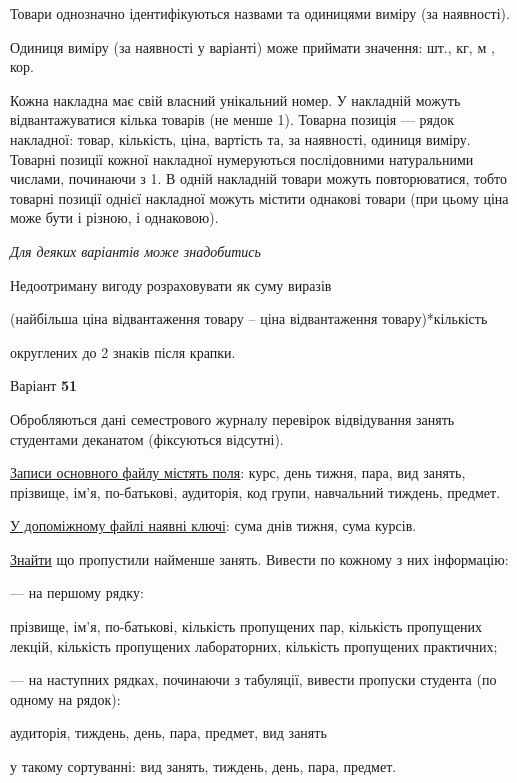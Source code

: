 \documentclass[11pt, ukrainian]{article}
\begin{document}
Товари однозначно ідентифікуються назвами та одиницями виміру (за наявності).

Одиниця виміру (за наявності у варіанті) може приймати значення: шт., кг, м , кор.

Кожна накладна має свій власний унікальний номер.
У накладній можуть відвантажуватися кілька товарів (не менше 1).
Товарна позиція --- рядок накладної: товар, кількість, ціна, вартість та, за наявності, одиниця виміру.
Товарні позиції кожної накладної нумеруються послідовними натуральними числами, починаючи з 1.
В одній накладній товари можуть повторюватися, 
тобто товарні позиції однієї накладної можуть містити однакові товари 
(при цьому ціна може бути і різною, і однаковою).

\bigskip\textit{Для деяких варіантів може знадобитись}

Недоотриману вигоду розраховувати як суму виразів
{\center (найбільша ціна відвантаження товару – ціна відвантаження товару)*кількість\par}

\bigskip
{\noindent} округлених до 2 знаків після крапки.




\par
\newpage

{\center Варіант  \No \textbf { 51 }\par}
\bigskip
Обробляються дані семестрового журналу перевірок відвідування занять студентами деканатом (фіксуються відсутні). 

\underline{Записи основного файлу містять поля}: курс, день тижня, пара, вид занять, прізвище, ім’я, по-батькові, аудиторія, код групи, навчальний тиждень, предмет.

\underline{У допоміжному файлі наявні ключі}: сума днів тижня, сума курсів.

\underline{Знайти} що пропустили найменше занять. Вивести по кожному з них інформацію:\par
{\noindent}--- на першому рядку:\par
прізвище, ім’я, по-батькові, кількість пропущених пар, кількість пропущених лекцій, кількість пропущених лабораторних, кількість пропущених практичних;

{\noindent}--- на наступних рядках, починаючи з табуляції, вивести пропуски студента (по одному на рядок):\par
аудиторія, тиждень, день, пара, предмет, вид занять

{\noindent}у такому сортуванні: вид занять, тиждень, день, пара, предмет.
\end{document}
